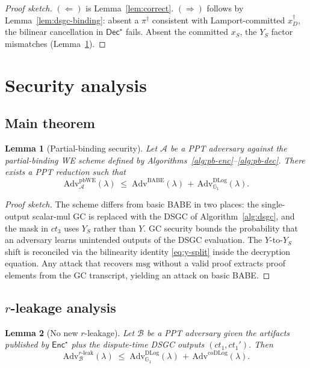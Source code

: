 \documentclass[11pt]{article}
\newtheorem{lemma}{Lemma}
\newcommand{\Gone}{\mathbb{G}_1}
\newcommand{\msg}{\mathrm{msg}}
\newcommand{\Enc}{\mathsf{Enc}}
\newcommand{\Dec}{\mathsf{Dec}}
\newcommand{\Adv}{\mathrm{Adv}}
\begin{document}
\begin{proof}[Proof sketch]
$(\Leftarrow)$ is Lemma~\ref{lem:correct}.
$(\Rightarrow)$ follows by Lemma~\ref{lem:dsgc-binding}: absent a
$\pi^\dagger$ consistent with Lamport-committed $x_D^\dagger$, the
bilinear cancellation in $\Dec^\star$ fails. Absent the committed
$x_S$, the $Y_S$ factor mismatches (Lemma~\ref{lem:pbwe}).
\end{proof}

\section{Security analysis}\label{sec:security}

\subsection{Main theorem}

\begin{lemma}[Partial-binding security]\label{lem:pbwe}
Let $\mathcal{A}$ be a PPT adversary against the partial-binding WE
scheme defined by Algorithms~\ref{alg:pb-enc}--\ref{alg:pb-dec}.
There exists a PPT reduction such that
\[
  \Adv^{\mathrm{pbWE}}_{\mathcal{A}}(\lambda)
  \;\leq\;
  \Adv^{\mathrm{BABE}}(\lambda) \,+\, \Adv^{\mathrm{DLog}}_{\Gone}(\lambda).
\]
\end{lemma}

\begin{proof}[Proof sketch]
The scheme differs from basic BABE in two places: the single-output
scalar-mul GC is replaced with the DSGC of
Algorithm~\ref{alg:dsgc}, and the mask in $ct_3$ uses $Y_S$ rather
than $Y$. GC security bounds the probability that an adversary
learns unintended outputs of the DSGC evaluation. The $Y$-to-$Y_S$
shift is reconciled via the bilinearity identity \eqref{eq:y-split}
inside the decryption equation. Any attack that recovers $\msg$
without a valid proof extracts proof elements from the GC
transcript, yielding an attack on basic BABE.
\end{proof}

\subsection{$r$-leakage analysis}

\begin{lemma}[No new $r$-leakage]\label{lem:r-leak}
Let $\mathcal{B}$ be a PPT adversary given the artifacts published
by $\Enc^\star$ plus the dispute-time DSGC outputs $(ct_1, ct_1')$.
Then
\[
  \Adv^{r\text{-leak}}_{\mathcal{B}}(\lambda)
  \;\leq\;
  \Adv^{\mathrm{DLog}}_{\Gone}(\lambda) \,+\, \Adv^{\mathrm{coDLog}}(\lambda).
\]
\end{lemma}
\end{document}

